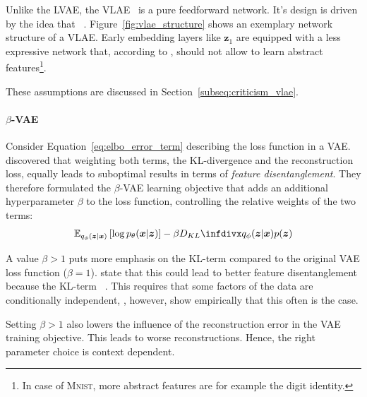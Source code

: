 Unlike the \ac{LVAE}, the \ac{VLAE}~\citep{zhao2017learning} is a pure feedforward network.
It's design is driven by the idea that ~\citep{zhao2017learning}.
Figure~\ref{fig:vlae_structure} shows an exemplary network structure of a \ac{VLAE}.
Early embedding layers like $\bm{z}_1$ are equipped with a less expressive network that, according to \citet{zhao2017learning}, should not allow to learn abstract features\footnote{In case of \textsc{Mnist}, more abstract features are for example the digit identity.}.

These assumptions are discussed in Section~\ref{subseq:criticism_vlae}.

\paragraph{$\beta$-VAE}

Consider Equation~\ref{eq:elbo_error_term} describing the loss function in a \ac{VAE}.
\citet{higgins2017beta} discovered that weighting both terms, the KL-divergence and the reconstruction loss, equally leads to suboptimal results in terms of \textit{feature disentanglement}.
They therefore formulated the $\beta$-VAE learning objective that adds an additional hyperparameter $\beta$ to the loss function, controlling the relative weights of the two terms:
\begin{align}
    \mathbb{E}_{q_{\phi}(\bm{z} | \bm{x})}\left[\log p_{\theta}(\bm{x} | \bm{z})\right]-\beta \kldiv{q_{\phi}(\bm{z} | \bm{x})}{p(\bm{z})} \label{eq:beta-vae}
\end{align}

A value $\beta > 1$ puts more emphasis on the KL-term compared to the original \ac{VAE} loss function ($\beta = 1$).
\citet{higgins2017beta} state that this could lead to better feature disentanglement because the KL-term ~\citep{higgins2017beta}.
This requires that some factors of the data are conditionally independent, \citet{higgins2017beta}, however, show empirically that this often is the case.

Setting $\beta > 1$ also lowers the influence of the reconstruction error in the \ac{VAE} training objective.
This leads to worse reconstructions.
Hence, the right parameter choice is context dependent.

